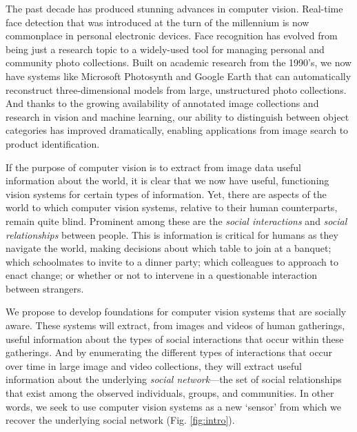 \pagestyle{plain} 

\begin{center}
{\Large{\bf \mytitle}}
\end{center}
\vspace{-0.1in}

\label{sec:intro}


The past decade has produced stunning advances in computer vision. Real-time face detection that was introduced at the turn of the millennium is now commonplace in personal electronic devices. Face recognition has evolved from being just a research topic to a widely-used tool for managing personal and community photo collections. Built on academic research from the 1990's, we now have systems like Microsoft Photosynth and Google Earth that can automatically reconstruct three-dimensional models from large, unstructured photo collections. And thanks to the growing availability of annotated image collections and research in vision and machine learning, our ability to distinguish between object categories has improved dramatically, enabling applications from image search to product identification.

If the purpose of computer vision is to extract from image data useful information about the world, it is clear that we now have useful, functioning vision systems for certain types of information. Yet, there are aspects of the world to which computer vision systems, relative to their human counterparts, remain quite blind. Prominent among these are the \emph{social interactions} and \emph{social relationships} between people. This is information is critical for humans as they navigate the world, making decisions about which table to join at a banquet; which schoolmates to invite to a dinner party; which colleagues to approach to enact change; or whether or not to intervene in a questionable interaction between strangers.


We propose to develop foundations for computer vision systems that are socially aware. These systems will extract, from images and videos of human gatherings, useful information about the types of social interactions that occur within these gatherings. And by enumerating the different types of interactions that occur over time in large image and video collections, they will extract useful information about the underlying \emph{social network}---the set of social relationships that exist among the observed individuals, groups, and communities. In other words, we seek to use computer vision systems as a new `sensor' from which we recover the underlying social network (Fig. \ref{fig:intro}).

